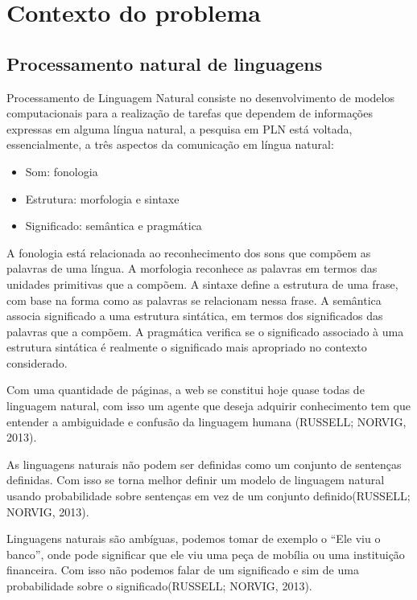 \chapter{Contexto do problema} \label{c:contexto_do_problema}

\section{Processamento natural de linguagens} \label{s:processamento_natural_de_linguagens}

Processamento de Linguagem Natural consiste no desenvolvimento de modelos computacionais para a realização de tarefas que dependem de informações expressas em alguma língua natural, a pesquisa em PLN está voltada, essencialmente, a três aspectos da comunicação em língua natural:
\begin{itemize}
\item  Som: fonologia
\item  Estrutura: morfologia e sintaxe
\item  Significado: semântica e pragmática
\end{itemize}
A fonologia está relacionada ao reconhecimento dos sons que compõem as palavras de uma língua. A morfologia reconhece as palavras em termos das unidades primitivas que a compõem. A sintaxe define a estrutura de uma frase, com base na forma como as palavras se relacionam nessa frase.  A semântica associa significado a uma estrutura sintática, em termos dos significados das palavras que a compõem. A pragmática verifica se o significado associado à uma estrutura sintática é realmente o significado mais apropriado no contexto considerado.

Com uma quantidade de páginas, a web se constitui hoje quase todas de linguagem natural, com isso um agente que deseja adquirir conhecimento tem que entender a ambiguidade e confusão da linguagem humana (RUSSELL; NORVIG, 2013).

As linguagens naturais não podem ser definidas como um conjunto de sentenças definidas. Com isso se torna melhor definir um modelo de linguagem natural usando probabilidade sobre sentenças em vez de um conjunto definido(RUSSELL; NORVIG, 2013).

Linguagens naturais são ambíguas, podemos tomar de exemplo o “Ele viu o banco”, onde pode significar que ele viu uma peça de mobília ou uma instituição financeira. Com isso não podemos falar de um significado e sim de uma probabilidade sobre o significado(RUSSELL; NORVIG, 2013).

